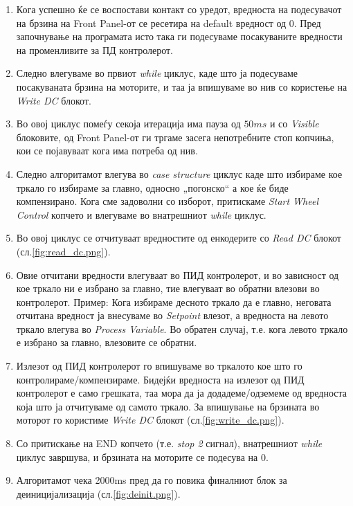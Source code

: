 \documentclass{article}
\begin{document}
\begin{enumerate}
\item Кога успешно ќе се воспостави контакт со уредот, вредноста на подесувачот на брзина на Front Panel-от се ресетира на default вредност од 0. Пред започнување на програмата исто така ги подесуваме посакуваните вредности на променливите за ПД контролерот.
\item Следно влегуваме во првиот \textit{while} циклус, каде што ја подесуваме посакуваната брзина на моторите, и таа ја впишуваме во нив со користење на \textit{Write DC} блокот. 
\item Во овој циклус помеѓу секоја итерација има пауза од $50ms$ и со \textit{Visible} блоковите, од Front Panel-от ги тргаме засега непотребните стоп копчиња, кои се појавуваат кога има потреба од нив.
\item Следно алгоритамот влегува во \textit{case structure} циклус каде што избираме кое тркало го избираме за главно, односно „погонско“ а кое ќе биде компензирано. Кога сме задоволни со изборот, притискаме \textit{Start Wheel Control} копчето и влегуваме во внатрешниот \textit{while} циклус. 
\item Во овој циклус се отчитуваат вредностите од енкодерите со \textit{Read DC} блокот (сл.\ref{fig:read_dc.png}).
\item Овие отчитани вредности влегуваат во ПИД контролерот, и во зависност од кое тркало ни е избрано за главно, тие влегуваат во обратни влезови во контролерот. Пример: Кога избираме десното тркало да е главно, неговата отчитана вредност ја внесуваме во \textit{Setpoint} влезот, а вредноста на левото тркало влегува во \textit{Process Variable}. Во обратен случај, т.е. кога левото тркало е избрано за главно, влезовите се обратни.
\item Излезот од ПИД контролерот го впишуваме во тркалото кое што го контролираме/компензираме. Бидејќи вредноста на излезот од ПИД контролерот е само грешката, таа мора да ја додадеме/одземеме од вредноста која што ја отчитуваме од самото тркало. За впишување на брзината во моторот го користиме \textit{Write DC} блокот (сл.\ref{fig:write_dc.png}).
\item Со притискање на END копчето (т.е. \textit{stop 2} сигнал), внатрешниот \textit{while} циклус завршува, и брзината на моторите се подесува на 0.
\item Алгоритамот чека 2000ms пред да го повика финалниот блок за деиницијализација (сл.\ref{fig:deinit.png}).
\end{enumerate}
\end{document}
